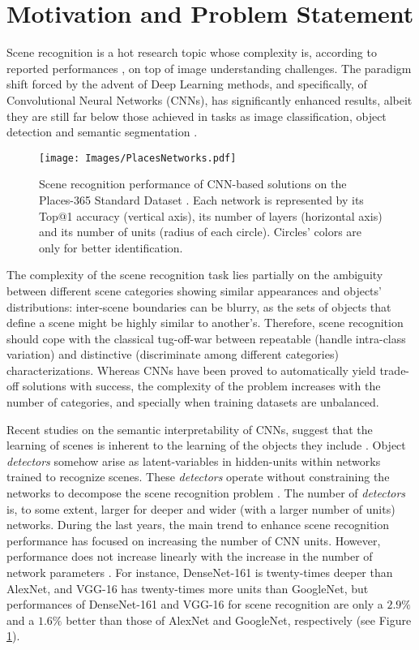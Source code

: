 \documentclass[review, 3p, sort&compress]{elsarticle}
\begin{document}
\section{Motivation and Problem Statement}\label{sec:Problem Motivation}

Scene recognition is a hot research topic whose complexity is, according to reported performances \cite{zhou2018places}, on top of image understanding challenges. The paradigm shift forced by the advent of Deep Learning methods, and specifically, of Convolutional Neural Networks (CNNs), has significantly enhanced results, albeit they are still far below those achieved in tasks as image classification, object detection and semantic segmentation \cite{ILSVRC15ImageNet,zhou2017scene,Cordts2016Cityscapes}.

\begin{figure}[t!]
    \centering
    \texttt{[image: Images/PlacesNetworks.pdf]}
    \caption{Scene recognition performance of CNN-based solutions on the Places-365 Standard Dataset \cite{zhou2018places}. Each network is represented by its Top@1 accuracy (vertical axis), its number of layers (horizontal axis) and its number of units (radius of each circle). Circles' colors are only for better identification.}
    \label{fig:Places Networks}
\end{figure}

The complexity of the scene recognition task lies partially on the ambiguity between different scene categories showing similar appearances and objects' distributions: inter-scene boundaries can be blurry, as the sets of objects that define a scene might be highly similar to another's. Therefore, scene recognition should cope with the classical tug-off-war between repeatable (handle intra-class variation) and distinctive (discriminate among different categories) characterizations. Whereas CNNs have been proved to automatically yield trade-off solutions with success, the complexity of the problem increases with the number of categories, and specially when training datasets are unbalanced.


Recent studies on the semantic interpretability of CNNs, suggest that the learning of scenes is inherent to the learning of the objects they include \cite{bau2017network}. Object \textit{detectors} somehow arise as latent-variables in hidden-units within networks trained to recognize scenes. These \textit{detectors} operate without constraining the networks to decompose the scene recognition problem \cite{zhou2014object}. The number of \textit{detectors} is, to some extent, larger for deeper and wider (with a larger number of units) networks. During the last years, the main trend to enhance scene recognition performance has focused on increasing the number of CNN units. However, performance does not increase linearly with the increase in the number of network parameters \cite{zhou2018places}. For instance, DenseNet-161 is twenty-times deeper than AlexNet, and VGG-16 has twenty-times more units than GoogleNet, but performances of DenseNet-161 and VGG-16 for scene recognition are only a \(2.9 \%\) and a \(1.6 \%\) better than those of AlexNet and GoogleNet, respectively (see Figure \ref{fig:Places Networks}).
\end{document}
